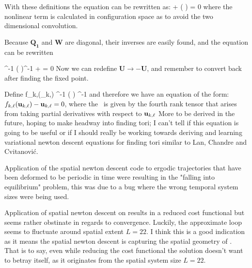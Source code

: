 With these definitions the equation can be rewritten as:
\beq
{}   + ( \otimes {}) = 0
\label{e-FksSpattempMat}
\eeq
where the nonlinear term is calculated in configuration space as to avoid the two dimensional convolution.

Because $\mathbf{Q_1}$ and $\mathbf{W}$ are diagonal, their inverses are easily found, and the equation  can be rewritten

\beq
{}^{-1} ( \otimes {})^{-1} +  = 0
\eeq
Now we can redefine $\mathbf{U} \rightarrow -\mathbf{U}$, and remember to convert
back after finding the fixed point.

Define
\beq
f_{k,\ell}(\utensor_{k,\ell}) \equiv {}^{-1} (  \otimes {})  ^{-1}
\eeq
and therefore we have an equation of the form:
$f_{k,\ell}(\mathbf{u}_{k,\ell})-\mathbf{u}_{k,\ell} = 0$,
where the \jacobianM\ is given by the fourth rank tensor that arises from taking partial derivatives with
respect to $\mathbf{u}_{k,\ell}$
More to be derived in the future, hoping to make headway into finding tori; I can't tell if this equation
is going to be useful or if I should really be working towards deriving and learning variational {newton descent}
equations for finding tori similar to Lan, Chandre and Cvitanovi{\'c}.

Application of the spatial {newton descent} code to ergodic trajectories that have been deformed to
be periodic in time were resulting in the "falling into equilibrium" problem, this was due to a bug
where the wrong temporal system sizes were being used.

Application of spatial {newton descent} on  results in a reduced cost
functional but seems rather obstinate in regards to convergence. Luckily, the
approximate loop seems to fluctuate around spatial extent $L=22$. I think this
is a good indication as it means the spatial {newton descent} is capturing the
spatial geometry of . That is to say, even while reducing the cost
functional the solution doesn't want to betray itself, as it originates from
the spatial system size $L=22$.

